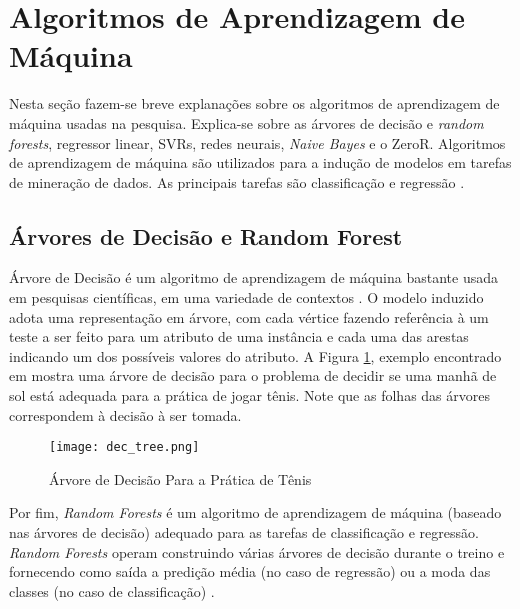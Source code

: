 \section{Algoritmos de Aprendizagem de Máquina}
Nesta seção fazem-se breve explanações sobre os algoritmos de aprendizagem de máquina
usadas na pesquisa. Explica-se sobre as árvores de decisão e \textit{random forests},
regressor linear, SVRs, redes neurais, \textit{Naive Bayes} e o ZeroR. 
Algoritmos de aprendizagem de máquina são utilizados para a indução de modelos em
tarefas de mineração de dados. As principais tarefas são classificação e regressão
\cite{ml_second_book}.

\subsection{Árvores de Decisão e Random Forest}
Árvore de Decisão é um algoritmo de aprendizagem de máquina bastante usada em
pesquisas científicas, em uma variedade de contextos \cite{ml_mitchell}. O modelo
induzido adota uma representação em árvore, com cada vértice fazendo referência à um
teste a ser feito para um atributo de uma instância e cada uma das arestas indicando
um dos possíveis valores do atributo. A Figura \ref{dec_tree}, exemplo encontrado em
\cite{ml_mitchell} mostra uma árvore de decisão para o problema de decidir se uma
manhã de sol está adequada para a prática de jogar tênis. Note que as folhas das
árvores correspondem à decisão à ser tomada. 

\begin{figure}[!ht]
    \centering
    \texttt{[image: dec\_tree.png]}
    \caption{Árvore de Decisão Para a Prática de Tênis} 
    \label{dec_tree}
\end{figure}

\par Por fim, \textit{Random Forests} é um algoritmo de aprendizagem de máquina
(baseado nas árvores de decisão) adequado para as tarefas de classificação e
regressão. \textit{Random Forests} operam construindo várias árvores de decisão
durante o treino e fornecendo como saída a predição média (no caso de regressão) ou a
moda das classes (no caso de classificação) \cite{random_forest}. 


